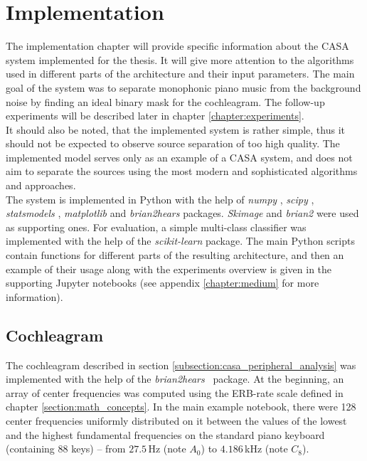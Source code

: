 \chapter{Implementation}\label{chapter:implementation}

The implementation chapter will provide specific information about the CASA system implemented for the thesis. It will give more attention to the algorithms used in different parts of the architecture and their input parameters. The main goal of the system was to separate monophonic piano music from the background noise by finding an ideal binary mask for the cochleagram. The follow-up experiments will be described later in chapter \ref{chapter:experiments}.\\

It should also be noted, that the implemented system is rather simple, thus it should not be expected to observe source separation of too high quality. The implemented model serves only as an example of a CASA system, and does not aim to separate the sources using the most modern and sophisticated algorithms and approaches.\\

The system is implemented in Python with the help of \textit{numpy} \cite{numpy}, \textit{scipy} \cite{scipy}, \textit{statsmodels} \cite{statsmodels}, \textit{matplotlib} \cite{matplotlib} and \textit{brian2hears} \cite{brian2hears} packages. \textit{Skimage} \cite{scikit-image} and \textit{brian2} \cite{brian2} were used as supporting ones. For evaluation, a simple multi-class classifier was implemented with the help of the \textit{scikit-learn} \cite{scikit-learn} package. The main Python scripts contain functions for different parts of the resulting architecture, and then an example of their usage along with the experiments overview is given in the supporting Jupyter notebooks (see appendix \ref{chapter:medium} for more information).

\section{Cochleagram}

The cochleagram described in section \ref{subsection:casa_peripheral_analysis} was implemented with the help of the \textit{brian2hears}~\cite{brian2hears} package. At the beginning, an array of center frequencies was computed using the ERB-rate scale defined in chapter \ref{section:math_concepts}. In the main example notebook, there were 128 center frequencies uniformly distributed on it between the values of the lowest and the highest fundamental frequencies on the standard piano keyboard (containing 88 keys) -- from $27.5$\,Hz (note $A_0$) to $4.186$\,kHz (note $C_8$).\\

